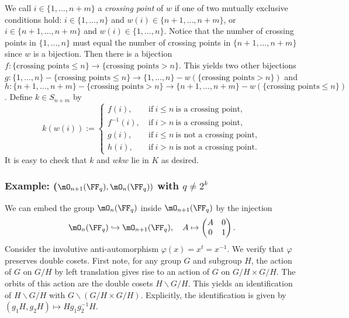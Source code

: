 We call $i\in\{1,\ldots,n+m\}$ a \emph{crossing point} of $w$ if one of two mutually exclusive conditions hold: $i\in\{1,\ldots,n\}$ and $w(i)\in\{n+1,\ldots,n+m\}$, or $i\in\{n+1,\ldots,n+m\}$ and $w(i)\in\{1,\ldots,n\}$.
Notice that the number of crossing points in $\{1,\ldots,n\}$ must equal the number of crossing points in $\{n+1,\ldots,n+m\}$ since $w$ is a bijection.
Then there is a bijection $f\colon \{\text{crossing points}\leq n\} \to \{\text{crossing points}>n\}$.
This yields two other bijections $g\colon \{1,\ldots,n\}-\{\text{crossing points}\leq n\} \to \{1,\ldots,n\}-w(\{\text{crossing points}>n\})$ and $h\colon \{n+1,\ldots,n+m\}-\{\text{crossing points}>n\} \to \{n+1,\ldots,n+m\} - w(\{\text{crossing points}\leq n\})$. Define $k\in S_{n+m}$ by
\[
	k(w(i)) := \begin{cases}
		f(i),\       & \text{if}\ i\leq n\ \text{is a crossing point},     \\
		f^{-1}(i),\  & \text{if}\ i>n\ \text{is a crossing point},         \\
		g(i),\       & \text{if}\ i\leq n\ \text{is not a crossing point}, \\
		h(i),\       & \text{if}\ i> n\ \text{is not a crossing point}.
	\end{cases}
\]
It is easy to check that $k$ and $wkw$ lie in $K$ as desired.

\subsubsection{Example: ($\mO_{n+1}(\FF_q),\mO_n(\FF_q))$ with $q\neq 2^k$}
We can embed the group $\mO_n(\FF_q)$ inside $\mO_{n+1}(\FF_q)$ by the injection
\[
	\mO_n(\FF_q) \hookrightarrow \mO_{n+1}(\FF_q),\quad A \mapsto \begin{pmatrix} A & 0 \\ 0 & 1 \end{pmatrix}.
\]
Consider the involutive anti-automorphism $\varphi(x)=x^t=x^{-1}$.
We verify that $\varphi$ preserves double cosets.
First note, for any group $G$ and subgroup $H$, the action of $G$ on $G/H$ by left translation gives rise to an action of $G$ on $G/H\times G/H$.
The orbits of this action are the double cosets $H\backslash G/H$.
This yields an identification of $H\backslash G/H$ with $G\backslash (G/H\times G/H)$.
Explicitly, the identification is given by $(g_1H,g_2H)\mapsto Hg_1g_2^{-1}H$.

